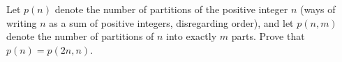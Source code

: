 Let $p(n)$ denote the number of partitions of the positive integer $n$ (ways of writing $n$ as a sum of positive integers, disregarding order), and let $p(n,m)$ denote the number of partitions of $n$ into exactly $m$ parts. Prove that $p(n)=p(2n,n)$.
